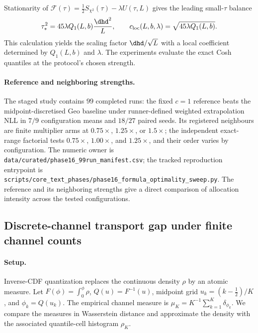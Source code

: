 Stationarity of
$\mathcal F(\tau)=\tfrac12S_{\chi^2}(\tau)-\lambda U(\tau,L)$ gives the
leading small-$\tau$ balance
\begin{equation}
\tau_*^2=45\lambda Q_1(L,b)\frac{\dhd^2}{L},
\qquad
c_{\mathrm{loc}}(L,b,\lambda)=\sqrt{45\lambda Q_1(L,b)}.
\label{eq:tau-leading-balance}
\end{equation}
This calculation yields the scaling factor $\dhd/\sqrt L$ with a local
coefficient determined by $Q_1(L,b)$ and $\lambda$. The experiments evaluate
the exact Cosh quantiles at the protocol's chosen strength.

\paragraph{Reference and neighboring strengths.}
The staged study contains $99$ completed runs: the fixed $c{=}1$ reference
beats the midpoint-discretised Geo baseline under runner-defined weighted
extrapolation NLL in $7/9$ configuration means and $18/27$ paired seeds.  Its
registered neighbours are finite multiplier arms
at $0.75\times$, $1.25\times$, or $1.5\times$; the independent exact-range
factorial tests $0.75\times$, $1.00\times$, and $1.25\times$, and their order
varies by configuration.  The numeric owner is
\texttt{data/curated/phase16\_99run\_manifest.csv}; the tracked reproduction
entrypoint is
\texttt{scripts/core\_text\_phases/phase16\_formula\_optimality\_sweep.py}.
The reference and its neighboring strengths give a direct comparison of
allocation intensity across the tested configurations.

\FloatBarrier
\subsection{Discrete-channel transport gap under finite channel counts}
\label{sec:discrete-continuous-gap}

\paragraph{Setup.} Inverse-CDF quantization replaces the continuous density $\rho$ by an atomic measure. Let $F(\phi){=}\int_0^\phi\rho$, $Q(u){=}F^{-1}(u)$, midpoint grid $u_k{=}(k{-}\tfrac{1}{2})/K$, and $\phi_k{=}Q(u_k)$. The empirical channel measure is $\mu_K{=}K^{-1}\sum_{k=1}^{K}\delta_{\phi_k}$. We compare the measures in Wasserstein distance and approximate the density
with the associated quantile-cell histogram $\rho_K$.

